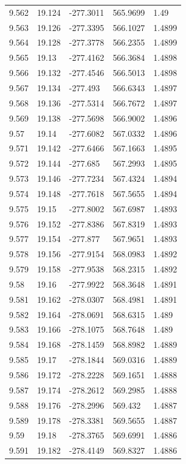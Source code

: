 \begin{tabular}{lllll}
9.562 & 19.124 & -277.3011 & 565.9699 & 1.49 \\
9.563 & 19.126 & -277.3395 & 566.1027 & 1.4899 \\
9.564 & 19.128 & -277.3778 & 566.2355 & 1.4899 \\
9.565 & 19.13 & -277.4162 & 566.3684 & 1.4898 \\
9.566 & 19.132 & -277.4546 & 566.5013 & 1.4898 \\
9.567 & 19.134 & -277.493 & 566.6343 & 1.4897 \\
9.568 & 19.136 & -277.5314 & 566.7672 & 1.4897 \\
9.569 & 19.138 & -277.5698 & 566.9002 & 1.4896 \\
9.57 & 19.14 & -277.6082 & 567.0332 & 1.4896 \\
9.571 & 19.142 & -277.6466 & 567.1663 & 1.4895 \\
9.572 & 19.144 & -277.685 & 567.2993 & 1.4895 \\
9.573 & 19.146 & -277.7234 & 567.4324 & 1.4894 \\
9.574 & 19.148 & -277.7618 & 567.5655 & 1.4894 \\
9.575 & 19.15 & -277.8002 & 567.6987 & 1.4893 \\
9.576 & 19.152 & -277.8386 & 567.8319 & 1.4893 \\
9.577 & 19.154 & -277.877 & 567.9651 & 1.4893 \\
9.578 & 19.156 & -277.9154 & 568.0983 & 1.4892 \\
9.579 & 19.158 & -277.9538 & 568.2315 & 1.4892 \\
9.58 & 19.16 & -277.9922 & 568.3648 & 1.4891 \\
9.581 & 19.162 & -278.0307 & 568.4981 & 1.4891 \\
9.582 & 19.164 & -278.0691 & 568.6315 & 1.489 \\
9.583 & 19.166 & -278.1075 & 568.7648 & 1.489 \\
9.584 & 19.168 & -278.1459 & 568.8982 & 1.4889 \\
9.585 & 19.17 & -278.1844 & 569.0316 & 1.4889 \\
9.586 & 19.172 & -278.2228 & 569.1651 & 1.4888 \\
9.587 & 19.174 & -278.2612 & 569.2985 & 1.4888 \\
9.588 & 19.176 & -278.2996 & 569.432 & 1.4887 \\
9.589 & 19.178 & -278.3381 & 569.5655 & 1.4887 \\
9.59 & 19.18 & -278.3765 & 569.6991 & 1.4886 \\
9.591 & 19.182 & -278.4149 & 569.8327 & 1.4886 \\

\end{tabular}

